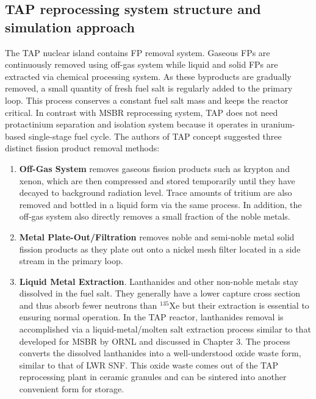 \subsection{TAP reprocessing system structure and simulation approach}
The \gls{TAP} nuclear island contains \gls{FP} removal system. Gaseous \glspl{FP} are 
continuously removed using off-gas system while liquid and solid \glspl{FP} are extracted 
via chemical processing system. As these byproducts are gradually removed, a small quantity 
of fresh fuel salt is regularly added to the primary loop. This process conserves a 
constant fuel salt mass and keeps the reactor critical. In contrast with \gls{MSBR} 
reprocessing system, \gls{TAP} does not need protactinium separation and isolation 
system because it operates in uranium-based single-stage fuel cycle. The authors of 
\gls{TAP} concept suggested three distinct fission product removal methods: 
\begin{enumerate}
	\item \textbf{Off-Gas System} removes gaseous fission products such as krypton 
and xenon, 
which are then compressed and stored temporarily until they have decayed to background 
radiation level. Trace amounts of tritium are also removed and bottled in a liquid form 
via the same process. In addition, the off-gas system also directly removes a small 
fraction of the noble metals.
	\item \textbf{Metal Plate-Out/Filtration} removes noble and semi-noble metal 
solid fission 
products as they plate out onto a nickel mesh filter located in a side stream in the 
primary loop.
	\item \textbf{Liquid Metal Extraction}. Lanthanides and other non-noble 
metals stay dissolved in the fuel salt. They generally have a lower capture cross 
section and thus absorb fewer neutrons than $^{135}$Xe but their extraction is essential 
to ensuring normal operation. In the \gls{TAP} reactor, lanthanides removal is
accomplished via 
a liquid-metal/molten salt extraction process similar to that developed for \gls{MSBR} 
by \gls{ORNL} \cite{robertson_conceptual_1971} and discussed in Chapter 3. The process 
converts the dissolved lanthanides into a well-understood oxide waste form, similar to 
that of \gls{LWR} \gls{SNF}. This oxide waste comes out of the \gls{TAP} reprocessing 
plant in ceramic granules and can be sintered into another convenient form for storage.
\end{enumerate}

